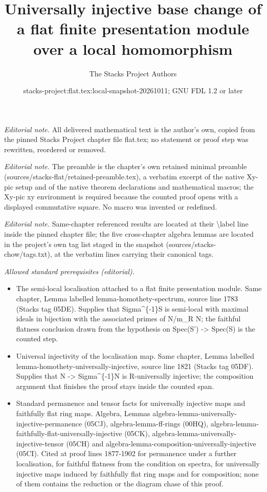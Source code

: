 \documentclass[10pt,a4paper]{amsart}
\title{Universally injective base change of a flat finite presentation module over a local homomorphism}
\author{The Stacks Project Authors}
\date{stacks-project:flat.tex:local-snapshot-20261011; GNU FDL 1.2 or later}
\theoremstyle{plain}
\theoremstyle{definition}
\theoremstyle{remark}
\numberwithin{equation}{subsection}
\begin{document}
\maketitle
\noindent\textit{Editorial note.} All delivered mathematical text is the author's own, copied from the pinned Stacks Project chapter file flat.tex; no statement or proof step was rewritten, reordered or removed.\par\medskip
\noindent\textit{Editorial note.} The preamble is the chapter's own retained minimal preamble (sources/stacks-flat/retained-preamble.tex), a verbatim excerpt of the native Xy-pic setup and of the native theorem declarations and mathematical macros; the Xy-pic xy environment is required because the counted proof opens with a displayed commutative square. No macro was invented or redefined.\par\medskip
\noindent\textit{Editorial note.} Same-chapter referenced results are located at their \textbackslash{}label line inside the pinned chapter file; the five cross-chapter algebra lemmas are located in the project's own tag list staged in the snapshot (sources/stacks-chow/tags.txt), at the verbatim lines carrying their canonical tags.\par\medskip
\noindent\textit{Allowed standard prerequisites (editorial).}\begin{itemize}
\item The semi-local localisation attached to a flat finite presentation module. Same chapter, Lemma labelled lemma-homothety-spectrum, source line 1783 (Stacks tag 05DE). Supplies that Sigma\textasciicircum{}\{-1\}S is semi-local with maximal ideals in bijection with the associated primes of N/m\_R N; the faithful flatness conclusion drawn from the hypothesis on Spec(S') -> Spec(S) is the counted step.
\item Universal injectivity of the localisation map. Same chapter, Lemma labelled lemma-homothety-universally-injective, source line 1821 (Stacks tag 05DF). Supplies that N -> Sigma\textasciicircum{}\{-1\}N is R-universally injective; the composition argument that finishes the proof stays inside the counted span.
\item Standard permanence and tensor facts for universally injective maps and faithfully flat ring maps. Algebra, Lemmas algebra-lemma-universally-injective-permanence (05CJ), algebra-lemma-ff-rings (00HQ), algebra-lemma-faithfully-flat-universally-injective (05CK), algebra-lemma-universally-injective-tensor (05CH) and algebra-lemma-composition-universally-injective (05CI). Cited at proof lines 1877-1902 for permanence under a further localisation, for faithful flatness from the condition on spectra, for universally injective maps induced by faithfully flat ring maps and for composition; none of them contains the reduction or the diagram chase of this proof.
\end{itemize}\medskip
\end{document}

